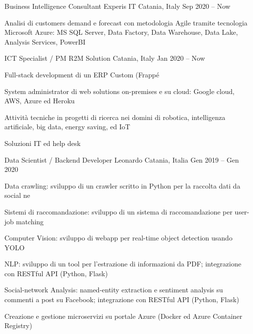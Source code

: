 
  \begin{cventries}
    \cventry
    {Business Intelligence Consultant}
    {Experis IT}    
    {Catania, Italy}
    {Sep 2020 -- Now}
    {
      \begin{cvitems}
        \item {
          Analisi di customers demand e forecast con metodologia Agile tramite tecnologia Microsoft Azure: 
          MS SQL Server, Data Factory, Data Warehouse, Data Lake, Analysis Services, PowerBI
        }
      \end{cvitems}
    }

    \cventry
    {ICT Specialist / PM}
    {R2M Solution}    
    {Catania, Italy}
    {Jan 2020 -- Now}
    {
      \begin{cvitems}
        \item {Full-stack development di un ERP Custom (Frappé}
        \item {System administrator di web solutions on-premises e su cloud: Google cloud, AWS, Azure ed Heroku}
        \item {Attività tecniche in progetti di ricerca nei domini di robotica, intelligenza artificiale, big data, energy saving, ed IoT}
        \item {Soluzioni IT ed help desk}
      \end{cvitems}
    }

    \cventry
    {Data Scientist / Backend Developer}
    {Leonardo}    
    {Catania, Italia}
    {Gen 2019 -- Gen 2020}
    {
      \begin{cvitems}
        \item {Data crawling: sviluppo di un crawler scritto in Python per la raccolta dati da social ne}
        \item {Sistemi di raccomandazione: sviluppo di un sistema di raccomandazione per user-job matching}
        \item {Computer Vision: sviluppo di webapp per real-time object detection usando YOLO}
        \item {NLP: sviluppo di un tool per l'estrazione di informazioni da PDF; integrazione con RESTful API (Python, Flask)}
        \item {Social-network Analysis: named-entity extraction e sentiment analysis su commenti a post su Facebook; integrazione con RESTful API (Python, Flask)}
        \item {Creazione e gestione microservizi su portale Azure (Docker ed Azure Container Registry)}
      \end{cvitems}
    }


\end{cventries}
